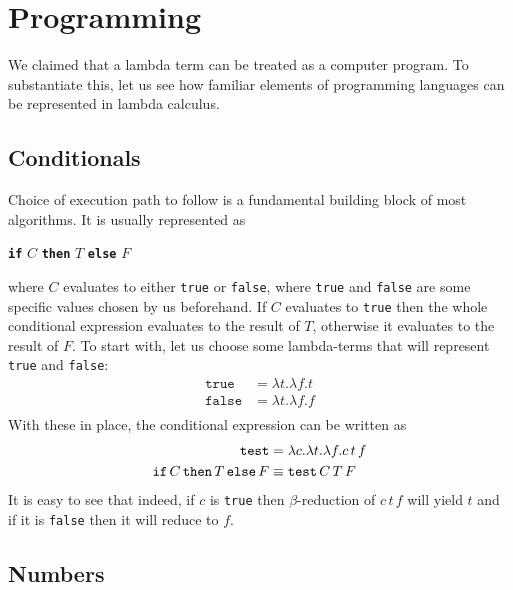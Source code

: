 \documentclass[11pt,twoside,a4paper]{article} %
\newcommand{\kw}[1]{{\bf \texttt{#1}}}
\newcommand{\mkw}[1]{{\bf \mathtt{#1}}}
\newcommand{\sym}[1]{\texttt{#1}}
\newcommand{\msym}[1]{\mathtt{#1}}
\begin{document}
\section{Programming}

We claimed that a lambda term can be treated as a computer program. To substantiate 
this, let us see how familiar elements of programming languages can be represented 
in lambda calculus.

\subsection{Conditionals}

Choice of execution path to follow is a fundamental building block of most
algorithms. It is usually represented as 
\begin{center}
\kw{if} $C$ \kw{then} $T$ \kw{else} $F$
\end{center}
where $C$ evaluates to either \sym{true} or \sym{false}, where \sym{true} and 
\sym{false} are some specific values chosen by us beforehand. If $C$ evaluates 
to \sym{true} then the whole conditional expression evaluates to the result of 
$T$, otherwise it evaluates to the result of $F$. To start with, let us choose 
some lambda-terms that will represent \sym{true} and \sym{false}:
\begin{align*}
\msym{true}  &= \lambda t.\lambda f.t \\
\msym{false} &= \lambda t.\lambda f.f \\
\end{align*}
With these in place, the conditional expression can be written as
\begin{align*}
\msym{test} &= \lambda c.\lambda t.\lambda f.c\,t\,f \\
\mkw{if}\,C\,\mkw{then}\,T\,\mkw{else}\,F &\equiv \msym{test}\,C\,T\,F
\end{align*}
It is easy to see that indeed, if $c$ is \sym{true} then $\beta$-reduction of
$c\,t\,f$ will yield $t$ and if it is \sym{false} then it will reduce to $f$.

\subsection{Numbers}
\end{document}
